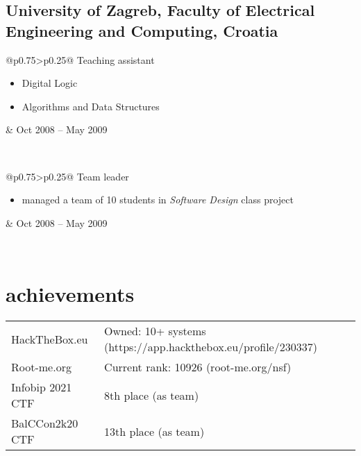\documentclass[a4paper]{article}
\makeatletter
\newlength{\tablewidth}
\newenvironment{period}[2]{%
\newcommand{\sarma}{#2}%
\setlength{\tablewidth}{\linewidth}
\addtolength{\tablewidth}{-2\tabcolsep}
\begin{tabular}{@{}p{0.75\tablewidth}>{\raggedleft\arraybackslash}p{0.25\tablewidth}@{}}%
#1 \newline
\begin{itemize}
}{%
\end{itemize} & \sarma \\%
\end{tabular}\\
}
\newenvironment{skills}{%
\setlength{\tablewidth}{\linewidth}
\addtolength{\tablewidth}{-2\tabcolsep}
\begin{tabular}{@{}p{0.17\tablewidth}p{0.85\tablewidth}@{}}
}{%
\end{tabular}
}
\makeatother
\begin{document}
\subsection{University of Zagreb, Faculty of Electrical Engineering and Computing, Croatia}
\begin{period}{Teaching assistant}{Oct 2008 -- May 2009}
    \item Digital Logic
    \item Algorithms and Data Structures
\end{period}
\begin{period}{Team leader}{Sep 2011 -- Jan 2012}
    \item managed a team of 10 students in \textit{Software Design} class project
\end{period}
\fi

\section{achievements}
\begin{skills}
    HackTheBox.eu   	&   Owned: 10+ systems (https://app.hackthebox.eu/profile/230337)\\
    Root-me.org     	&   Current rank: 10926 (root-me.org/nsf)\\
    Infobip 2021 CTF    &   8th place (as team) \\
    BalCCon2k20 CTF    	&   13th place (as team)

    
\end{skills}
\end{document}
